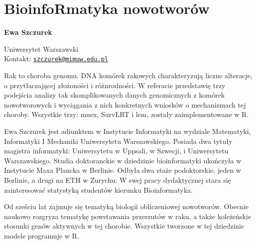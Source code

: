 \documentclass[\main/boa.tex]{subfiles}
\begin{document}
\section{BioinfoRmatyka nowotworów}


\begin{minipage}{0.915\textwidth}
	\centering
  {\bf \LARGE {} Ewa Szczurek}
\end{minipage}



\begin{affiliations}
\begin{minipage}{0.915\textwidth}
\centering
\large Uniwersytet Warszawski  \\[1pt]
Kontakt: \href{mailto:szczurek@mimuw.edu.pl}{\nolinkurl{szczurek@mimuw.edu.pl}}\\
\end{minipage}
\end{affiliations}


Rak to choroba genomu. DNA komórek rakowych charakteryzują liczne alteracje, o przytłaczającej złożoności i różnrodności. W referacie przedstawię trzy podejścia analizy tak skomplikowanych danych genomicznych z komórek nowotworowych i wyciągania z nich konkretnych wniosków o mechanizmach tej choroby. Wszystkie trzy: muex, SurvLRT i lem, zostały zaimplementowane w R. 

\bio
Ewa Szczurek jest adiunktem w Instytucie Informatyki na wydziale Matematyki, Informatyki I Mechaniki Uniwersytetu Warszawskiego. Posiada dwa tytuły magistra informatyki: Uniwersytetu w Uppsali, w Szwecji, i Uniwersytetu Warszawskiego. Studia doktoranckie w dziedzinie bioinformatyki ukończyła w Instytucie Maxa Plancka w Berlinie. Odbyła dwa staże podoktorskie, jeden w Berlinie, a drugi na ETH w Zurychu. W swej pracy dydaktycznej stara się zainteresować statystyką studentów kierunku Bioinformatyka.

Od sześciu lat zajmuje się tematyką biologii obliczeniowej nowotworów. Obecnie naukowo rozgryza tematykę powstawania przerzutów w raku, a także koleżeńskie stosunki genów aktywnych w tej chorobie. Wszystkie tworzone w tej dziedzinie modele programuje w R.
\end{document}
